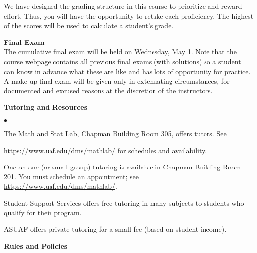 \documentclass[12pt]{article}
\renewcommand{\emph}[1]{\textsf{\textbf{#1}}}
\newcommand{\localhead}[1]{\par\smallskip\textbf{#1}\nobreak\\}%
\def\heading#1{\localhead{\large\emph{#1}}}
\def\subheading#1{\localhead{\emph{#1}}}
\newenvironment{clist}%
{\bgroup\parskip 0pt\begin{list}{$\bullet$}{\partopsep 4pt\topsep 0pt\itemsep -2pt}}%
{\end{list}\egroup}%
\begin{document}
We have designed the grading structure in this course to prioritize and reward effort. Thus, you will have the opportunity to retake each proficiency. The highest of the scores will be used to calculate a student's grade. 

\heading{Final Exam} 
The cumulative final exam will be held on Wednesday, May 1. Note that the course webpage contains all previous final exams (with solutions) so a student can know in advance what these are like  and has lots of opportunity for practice. A make-up final exam will be given only in extenuating circumstances, for documented and excused reasons at the discretion of the instructors.

\heading{Tutoring and Resources}
\vskip -30pt\strut
\begin{clist}
	\item The Math and Stat Lab, Chapman Building Room 305, offers tutors. 
	See 

	\url{https://www.uaf.edu/dms/mathlab/} for schedules and availability.
	\item One-on-one (or small group) tutoring is available in 
Chapman Building Room 201. You must schedule an
appointment; see \url{https://www.uaf.edu/dms/mathlab/}.
	\item Student Support Services offers free tutoring in many subjects to students who qualify for their program.
	\item ASUAF offers private tutoring for a small fee (based on student income).
\end{clist}

\heading{Rules and Policies}
\vskip -20pt

\end{document}
